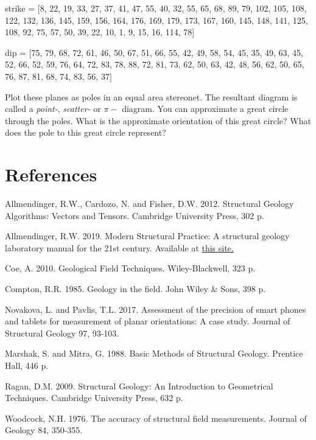 \documentclass[a4paper , 12pt]{book}
\begin{document}
\begin{enumerate}
  strike = [8, 22, 19, 33, 27, 37, 41, 47, 55, 40, 32, 55, 65, 68, 89, 79, 102, 105, 108, 122, 132, 136, 145, 159, 156, 164, 176, 169, 179, 173, 167, 160, 145, 148, 141, 125, 108, 92, 75, 57, 50, 39, 22, 10, 1, 9, 15, 16, 114, 78]
  
  dip = [75, 79, 68, 72, 61, 46, 50, 67, 51, 66, 55, 42, 49, 58, 54, 45, 35, 49, 63, 45, 52, 66, 52, 59, 76, 64, 72, 83, 78, 88, 72, 81, 73, 62, 50, 63, 42, 48, 56, 62, 50, 65, 76, 87, 81, 68, 74, 83, 56, 37]
  
  Plot these planes as poles in an equal area stereonet. The resultant diagram is called a \textit{point-}, \textit{scatter-} or $\pi-$ diagram. You can approximate a great circle through the poles. What is the approximate orientation of this great circle? What does the pole to this great circle represent?
  
\end{enumerate}

\section*{References}

Allmendinger, R.W., Cardozo, N. and Fisher, D.W. 2012. Structural Geology Algorithms: Vectors and Tensors. Cambridge University Press, 302 p.

Allmendinger, R.W. 2019. Modern Structural Practice: A structural geology laboratory manual for the 21st century. Available at \href{http://www.geo.cornell.edu/geology/faculty/RWA/structure-lab-manual}{this site.}

Coe, A. 2010. Geological Field Techniques. Wiley-Blackwell, 323 p.

Compton, R.R. 1985. Geology in the field. John Wiley \& Sons, 398 p.

Novakova, L. and Pavlis, T.L. 2017. Assessment of the precision of smart phones and tablets for measurement of planar orientations: A case study. Journal of Structural Geology 97, 93-103.

Marshak, S. and Mitra, G. 1988. Basic Methods of Structural Geology. Prentice Hall, 446 p.

Ragan, D.M. 2009. Structural Geology: An Introduction to Geometrical Techniques. Cambridge University Press, 632 p.

Woodcock, N.H. 1976. The accuracy of structural field measurements. Journal of Geology 84, 350-355.

\end{document}
